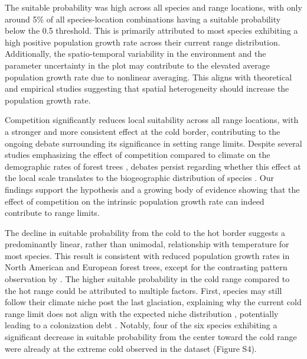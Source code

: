 The suitable probability was high across all species and range
locations, with only around 5\% of all species-location combinations
having a suitable probability below the 0.5 threshold. This is primarily
attributed to most species exhibiting a high positive population growth
rate across their current range distribution. Additionally, the
spatio-temporal variability in the environment and the parameter
uncertainty in the plot may contribute to the elevated average
population growth rate due to nonlinear averaging. This aligns with
theoretical \citep{Schreiber2009} and empirical \citep{Crone2016}
studies suggesting that spatial heterogeneity should increase the
population growth rate.

Competition significantly reduces local suitability across all range
locations, with a stronger and more consistent effect at the cold
border, contributing to the ongoing debate surrounding its significance
in setting range limits. Despite several studies emphasizing the effect
of competition compared to climate on the demographic rates of forest
trees \citep{Zhang2015, Kaber2021, LeSquin2021}, debates persist
regarding whether this effect at the local scale translates to the
biogeographic distribution of species
\citep{Soberon2007, CopenhaverParry2017}. Our findings support the
\citet{Godsoe2017} hypothesis and a growing body of evidence
\citep{Scherrer2020, Shi2020, Paquette2021, Lyu2022} showing that the
effect of competition on the intrinsic population growth rate can indeed
contribute to range limits.

The decline in suitable probability from the cold to the hot border
suggests a predominantly linear, rather than unimodal, relationship with
temperature for most species. This result is consistent with reduced
population growth rates in North American
\citep{schultz2022, LeSquin2021} and European \citep{Guyennon2023}
forest trees, except for the contrasting pattern observation by
\citet{Purves2009}. The higher suitable probability in the cold range
compared to the hot range could be attributed to multiple factors.
First, species may still follow their climate niche post the last
glaciation, explaining why the current cold range limit does not align
with the expected niche distribution \citep{Svenning2007}, potentially
leading to a colonization debt \citep{Talluto2017}. Notably, four of the
six species exhibiting a significant decrease in suitable probability
from the center toward the cold range were already at the extreme cold
observed in the dataset (Figure S4).

